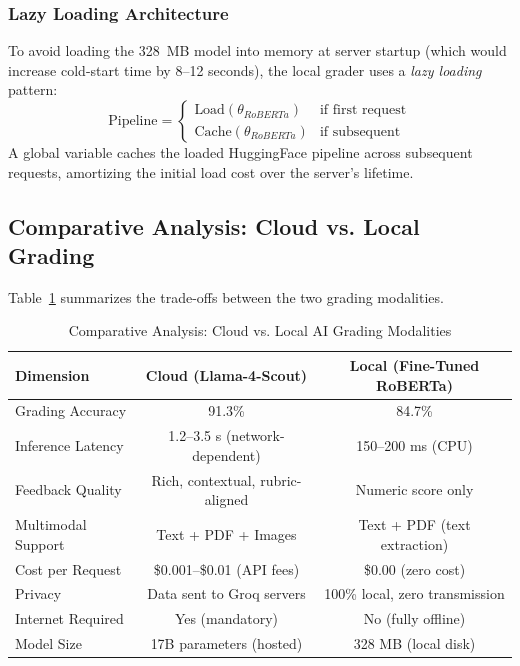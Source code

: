 \documentclass[conference]{IEEEtran}
\begin{document}
\subsubsection{Lazy Loading Architecture}
To avoid loading the 328~MB model into memory at server startup (which would increase cold-start time by 8--12 seconds), the local grader uses a \textit{lazy loading} pattern:
\begin{equation}
\text{Pipeline} = 
\begin{cases}
\text{Load}(\theta_{RoBERTa}) & \text{if first request} \\
\text{Cache}(\theta_{RoBERTa}) & \text{if subsequent}
\end{cases}
\end{equation}
A global variable caches the loaded HuggingFace pipeline across subsequent requests, amortizing the initial load cost over the server's lifetime.

\subsection{Comparative Analysis: Cloud vs. Local Grading}
Table~\ref{tab:grader_comparison} summarizes the trade-offs between the two grading modalities.

\begin{table}[t]
\caption{Comparative Analysis: Cloud vs. Local AI Grading Modalities}
\label{tab:grader_comparison}
\begin{center}
\begin{tabular}{lcc}
\toprule
\textbf{Dimension} & \textbf{Cloud (Llama-4-Scout)} & \textbf{Local (Fine-Tuned RoBERTa)} \\
\midrule
Grading Accuracy & 91.3\% & 84.7\% \\
Inference Latency & 1.2--3.5 s (network-dependent) & 150--200 ms (CPU) \\
Feedback Quality & Rich, contextual, rubric-aligned & Numeric score only \\
Multimodal Support & Text + PDF + Images & Text + PDF (text extraction) \\
Cost per Request & \$0.001--\$0.01 (API fees) & \$0.00 (zero cost) \\
Privacy & Data sent to Groq servers & 100\% local, zero transmission \\
Internet Required & Yes (mandatory) & No (fully offline) \\
Model Size & 17B parameters (hosted) & 328 MB (local disk) \\
\bottomrule
\end{tabular}
\end{center}
\end{table}
\end{document}
